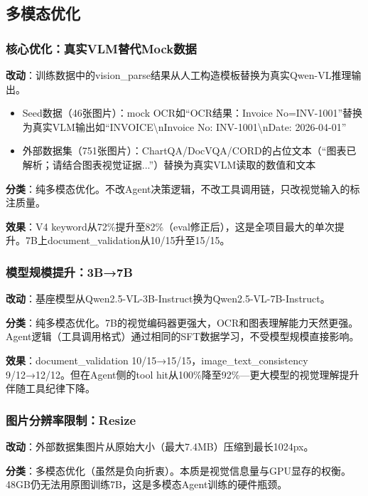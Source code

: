 \documentclass[fontset=none,11pt,a4paper]{ctexart}
\begin{document}
\subsection{多模态优化}

\subsubsection{核心优化：真实VLM替代Mock数据}

\textbf{改动}：训练数据中的vision\_parse结果从人工构造模板替换为真实Qwen-VL推理输出。

\begin{itemize}[nosep]
    \item Seed数据（46张图片）：mock OCR如``OCR结果：Invoice No=INV-1001''替换为真实VLM输出如``INVOICE\textbackslash nInvoice No: INV-1001\textbackslash nDate: 2026-04-01''
    \item 外部数据集（751张图片）：ChartQA/DocVQA/CORD的占位文本（``图表已解析；请结合图表视觉证据...''）替换为真实VLM读取的数值和文本
\end{itemize}

\textbf{分类}：纯多模态优化。不改Agent决策逻辑，不改工具调用链，只改视觉输入的标注质量。

\textbf{效果}：V4 keyword从72\%提升至82\%（eval修正后），这是全项目最大的单次提升。7B上document\_validation从10/15升至15/15。

\subsubsection{模型规模提升：3B→7B}

\textbf{改动}：基座模型从Qwen2.5-VL-3B-Instruct换为Qwen2.5-VL-7B-Instruct。

\textbf{分类}：纯多模态优化。7B的视觉编码器更强大，OCR和图表理解能力天然更强。Agent逻辑（工具调用格式）通过相同的SFT数据学习，不受模型规模直接影响。

\textbf{效果}：document\_validation 10/15→15/15，image\_text\_consistency 9/12→12/12。但在Agent侧的tool hit从100\%降至92\%---更大模型的视觉理解提升伴随工具纪律下降。

\subsubsection{图片分辨率限制：Resize}

\textbf{改动}：外部数据集图片从原始大小（最大7.4MB）压缩到最长1024px。

\textbf{分类}：多模态优化（虽然是负向折衷）。本质是视觉信息量与GPU显存的权衡。48GB仍无法用原图训练7B，这是多模态Agent训练的硬件瓶颈。
\end{document}
